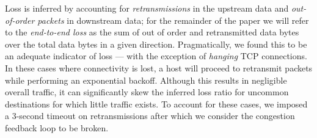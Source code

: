 
Loss is inferred by accounting for \emph{retransmissions} in the upstream data and \emph{out-of-order packets} in downstream data; for the remainder of the paper we will refer to the \emph{end-to-end loss} as the sum of out of order and retransmitted data bytes over the total data bytes in a given direction.
Pragmatically, we found this to be an adequate indicator of loss --- with the exception of \emph{hanging} TCP connections. 
In these cases where connectivity is lost, a host will proceed to retransmit packets while performing an exponential backoff. 
Although this results in negligible overall traffic, it can significantly skew the inferred loss ratio for uncommon destinations for which little traffic exists. 
To account for these cases, we imposed a 3-second timeout on retransmissions after which we consider the congestion feedback loop to be broken. 

